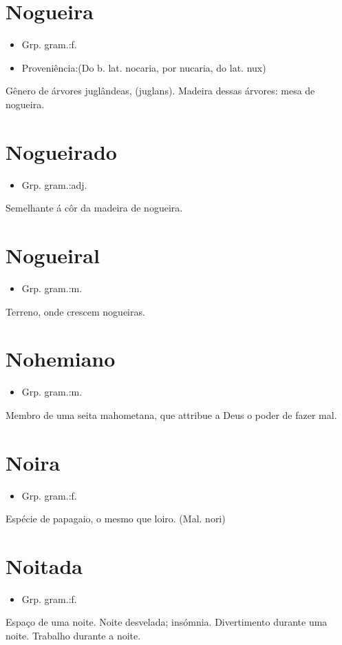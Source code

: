 \section{Nogueira}
\begin{itemize}
\item {Grp. gram.:f.}
\end{itemize}
\begin{itemize}
\item {Proveniência:(Do b. lat. \textunderscore nocaria\textunderscore , por \textunderscore nucaria\textunderscore , do lat. \textunderscore nux\textunderscore )}
\end{itemize}
Gênero de árvores juglândeas, (\textunderscore juglans\textunderscore ).
Madeira dessas árvores: \textunderscore mesa de nogueira\textunderscore .
\section{Nogueirado}
\begin{itemize}
\item {Grp. gram.:adj.}
\end{itemize}
Semelhante á côr da madeira de nogueira.
\section{Nogueiral}
\begin{itemize}
\item {Grp. gram.:m.}
\end{itemize}
Terreno, onde crescem nogueiras.
\section{Nohemiano}
\begin{itemize}
\item {Grp. gram.:m.}
\end{itemize}
Membro de uma seita mahometana, que attribue a Deus o poder de fazer mal.
\section{Noira}
\begin{itemize}
\item {Grp. gram.:f.}
\end{itemize}
Espécie de papagaio, o mesmo que \textunderscore loiro\textunderscore .
(Mal. \textunderscore nori\textunderscore )
\section{Noitada}
\begin{itemize}
\item {Grp. gram.:f.}
\end{itemize}
Espaço de uma noite.
Noite desvelada; insómnia.
Divertimento durante uma noite.
Trabalho durante a noite.
